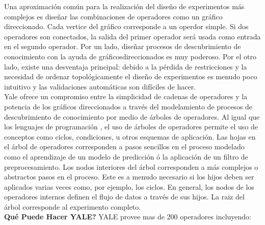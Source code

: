 Una aproximaci\'on com\'un para la realizaci\'on del dise\~no de experimentos m\'as complejos es dise\~nar las
combinaciones de operadores como un gr\'afico direccionado.  Cada vertice del gr\'afico corresponde a un operdor
simple. Si dos operadores son conectados, la salida del primer operador ser\'a usada como entrada en el segundo
operador.  Por un lado, dise\~nar procesos de des\-cubrimiento de conocimiento con la ayuda de
gr\'aficosdireccionados es muy poderoso.  Por el otro lado, existe una desventaja principal: debido a la
p\'erdida de restricciones y la necesidad de ordenar topol\'ogicamente el dise\~no de experimentos es menudo poco
intuitivo y las validaciones autom\'aticas son dif\'iciles de hacer.\\

Yale ofrece un compromiso entre la simplicidad de cadenas de operadores y la potencia de los gr\'aficos
direccionados a trav\'es del modelamiento de procesos de descubrimiento de conocimiento por medio de \'arboles de
operadores. Al igual que los lenguajes de programaci\'on , el uso de \'arboles de operadores permite el uso de
conceptos como ciclos, condiciones, u otros esquemas de aplicaci\'on.  Las hojas en el \'arbol de operadores
corresponden a pasos senci\-llos en el proceso modelado como el aprendizaje de un modelo de predicci\'on \'o la
aplicaci\'on de un filtro de preprocesamiento. Los nodos interiores del \'arbol corresponden a m\'as complejos o
abstractos pasos en el proceso.  Este es a menudo necesario si los hijos deben ser aplicados varias veces como,
por ejemplo, los ciclos.  En general, los nodos de los operadores internos definen el flujo de datos a trav\'es
de sus hijos. La raiz del \'arbol corresponde al experimento completo.\\

\textbf{Qu\'e Puede Hacer YALE?} YALE provee mas de 200 operadores incluyendo:

